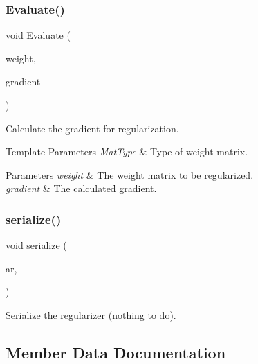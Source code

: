 \subsubsection{Evaluate()}
{\footnotesize\ttfamily void Evaluate (\begin{DoxyParamCaption}\item[{const Mat\+Type \&}]{weight,  }\item[{Mat\+Type \&}]{gradient }\end{DoxyParamCaption})}



Calculate the gradient for regularization. 


\begin{DoxyTemplParams}{Template Parameters}
{\em Mat\+Type} & Type of weight matrix. \\
\hline
\end{DoxyTemplParams}

\begin{DoxyParams}{Parameters}
{\em weight} & The weight matrix to be regularized. \\
\hline
{\em gradient} & The calculated gradient. \\
\hline
\end{DoxyParams}
\mbox{\label{classmlpack_1_1ann_1_1LRegularizer_a65cba07328997659bec80b9879b15a51}} 
\subsubsection{serialize()}
{\footnotesize\ttfamily void serialize (\begin{DoxyParamCaption}\item[{Archive \&}]{ar,  }\item[{const uint32\+\_\+t}]{ }\end{DoxyParamCaption})}



Serialize the regularizer (nothing to do). 



\subsection{Member Data Documentation}
\mbox{\label{classmlpack_1_1ann_1_1LRegularizer_a2d7e5dd7a479c4c7aef6e6133a1441c5}} 
